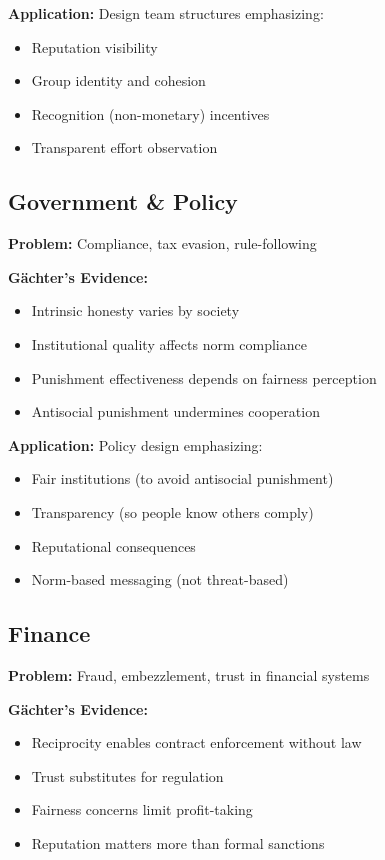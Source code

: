 \documentclass[11pt]{article}
\begin{document}
\textbf{Application:} Design team structures emphasizing:
\begin{itemize}
    \item Reputation visibility
    \item Group identity and cohesion
    \item Recognition (non-monetary) incentives
    \item Transparent effort observation
\end{itemize}

\subsection*{Government \& Policy}

\textbf{Problem:} Compliance, tax evasion, rule-following

\textbf{Gächter's Evidence:}
\begin{itemize}
    \item Intrinsic honesty varies by society
    \item Institutional quality affects norm compliance
    \item Punishment effectiveness depends on fairness perception
    \item Antisocial punishment undermines cooperation
\end{itemize}

\textbf{Application:} Policy design emphasizing:
\begin{itemize}
    \item Fair institutions (to avoid antisocial punishment)
    \item Transparency (so people know others comply)
    \item Reputational consequences
    \item Norm-based messaging (not threat-based)
\end{itemize}

\subsection*{Finance}

\textbf{Problem:} Fraud, embezzlement, trust in financial systems

\textbf{Gächter's Evidence:}
\begin{itemize}
    \item Reciprocity enables contract enforcement without law
    \item Trust substitutes for regulation
    \item Fairness concerns limit profit-taking
    \item Reputation matters more than formal sanctions
\end{itemize}
\end{document}

